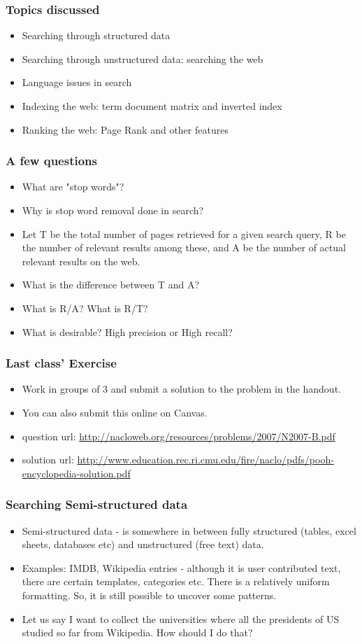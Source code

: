 \documentclass{beamer}
\begin{document}
\begin{frame}
\frametitle{Topics discussed}
\begin{itemize}
\item Searching through structured data
\item Searching through unstructured data: searching the web
\item Language issues in search
\item Indexing the web: term document matrix and inverted index
\item Ranking the web: Page Rank and other features
\end{itemize}
\end{frame}

\begin{frame}
\frametitle{A few questions}
\begin{itemize}
\item What are "stop words"? \pause
\item Why is stop word removal done in search? \pause
\item Let T be the total number of pages retrieved for a given search query, R be the number of relevant results among these, and A be the number of actual relevant results on the web.
\item What is the difference between T and A? \pause
\item What is R/A? What is R/T? \pause
\item What is desirable? High precision or High recall? 
\end{itemize}
\end{frame}

\begin{frame}
\frametitle{Last class' Exercise}
\begin{itemize}
\item Work in groups of 3 and submit a solution to the problem in the handout.
\item You can also submit this online on Canvas.
\item question url: \url{http://nacloweb.org/resources/problems/2007/N2007-B.pdf} \pause
\item solution url: \url{http://www.education.rec.ri.cmu.edu/fire/naclo/pdfs/pooh-encyclopedia-solution.pdf}
\end{itemize}
\end{frame}

\begin{frame}
\frametitle{Searching Semi-structured data}
\begin{itemize}
\item Semi-structured data - is somewhere in between fully structured (tables, excel sheets, databases etc) and unstructured (free text) data.
\item Examples: IMDB, Wikipedia entries - although it is user contributed text, there are certain templates, categories etc. There is a relatively uniform formatting. So, it is still possible to uncover some patterns. \pause
\item Let us say I want to collect the universities where all the presidents of US studied so far from Wikipedia. How should I do that? 
\end{itemize}
\end{frame}
\end{document}
